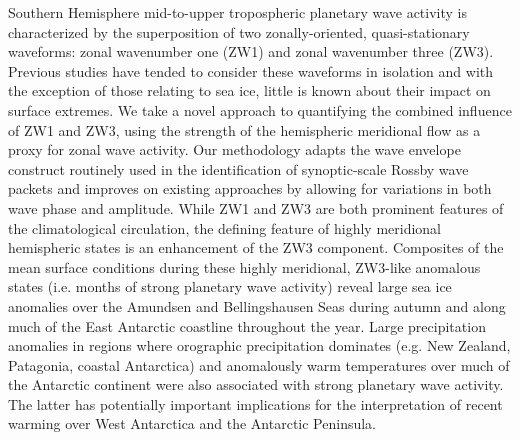 Southern Hemisphere mid-to-upper tropospheric planetary wave activity is characterized by the superposition of two zonally-oriented, quasi-stationary waveforms: zonal wavenumber one (ZW1) and zonal wavenumber three (ZW3). Previous studies have tended to consider these waveforms in isolation and with the exception of those relating to sea ice, little is known about their impact on surface extremes. We take a novel approach to quantifying the combined influence of ZW1 and ZW3, using the strength of the hemispheric meridional flow as a proxy for zonal wave activity. Our methodology adapts the wave envelope construct routinely used in the identification of synoptic-scale Rossby wave packets and improves on existing approaches by allowing for variations in both wave phase and amplitude. While ZW1 and ZW3 are both prominent features of the climatological circulation, the defining feature of highly meridional hemispheric states is an enhancement of the ZW3 component. Composites of the mean surface conditions during these highly meridional, ZW3-like anomalous states (i.e. months of strong planetary wave activity) reveal large sea ice anomalies over the Amundsen and Bellingshausen Seas during autumn and along much of the East Antarctic coastline throughout the year. Large precipitation anomalies in regions where orographic precipitation dominates (e.g. New Zealand, Patagonia, coastal Antarctica) and anomalously warm temperatures over much of the Antarctic continent were also associated with strong planetary wave activity. The latter has potentially important implications for the interpretation of recent warming over West Antarctica and the Antarctic Peninsula.
